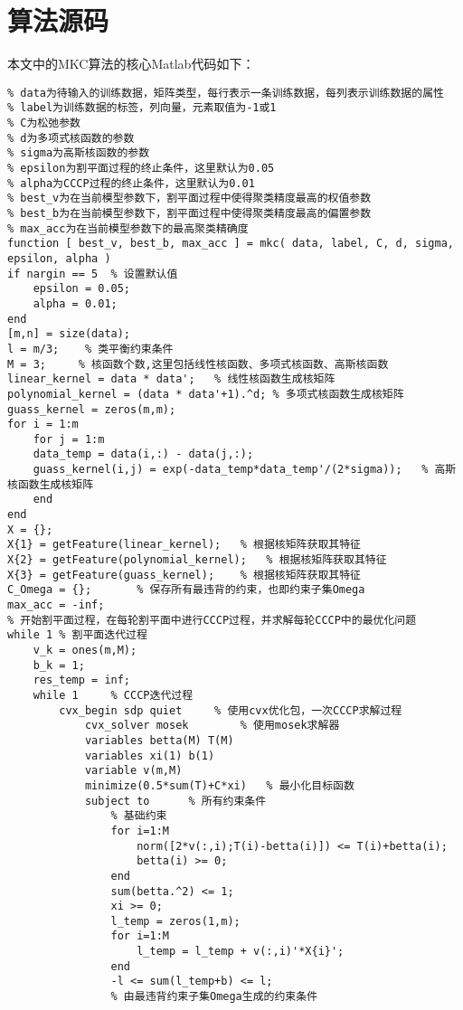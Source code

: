 \chapter*{算法源码}
\noindent 本文中的MKC算法的核心Matlab代码如下：
\begin{lstlisting}[basicstyle=\small\menlo]
% 参数介绍
% data为待输入的训练数据，矩阵类型，每行表示一条训练数据，每列表示训练数据的属性
% label为训练数据的标签，列向量，元素取值为-1或1
% C为松弛参数
% d为多项式核函数的参数
% sigma为高斯核函数的参数
% epsilon为割平面过程的终止条件，这里默认为0.05
% alpha为CCCP过程的终止条件，这里默认为0.01
% best_v为在当前模型参数下，割平面过程中使得聚类精度最高的权值参数
% best_b为在当前模型参数下，割平面过程中使得聚类精度最高的偏置参数
% max_acc为在当前模型参数下的最高聚类精确度
function [ best_v, best_b, max_acc ] = mkc( data, label, C, d, sigma, epsilon, alpha )
if nargin == 5	% 设置默认值
    epsilon = 0.05;
    alpha = 0.01;
end
[m,n] = size(data);
l = m/3;  	% 类平衡约束条件
M = 3;     % 核函数个数,这里包括线性核函数、多项式核函数、高斯核函数
linear_kernel = data * data';  	% 线性核函数生成核矩阵
polynomial_kernel = (data * data'+1).^d; % 多项式核函数生成核矩阵
guass_kernel = zeros(m,m);
for i = 1:m
    for j = 1:m
	data_temp = data(i,:) - data(j,:);
	guass_kernel(i,j) = exp(-data_temp*data_temp'/(2*sigma)); 	% 高斯核函数生成核矩阵
    end
end
X = {};
X{1} = getFeature(linear_kernel);	% 根据核矩阵获取其特征
X{2} = getFeature(polynomial_kernel);	% 根据核矩阵获取其特征
X{3} = getFeature(guass_kernel);	% 根据核矩阵获取其特征
C_Omega = {};		% 保存所有最违背的约束，也即约束子集Omega
max_acc = -inf;
% 开始割平面过程，在每轮割平面中进行CCCP过程，并求解每轮CCCP中的最优化问题
while 1	% 割平面迭代过程
    v_k = ones(m,M);
    b_k = 1;
    res_temp = inf;
    while 1		% CCCP迭代过程
        cvx_begin sdp quiet		% 使用cvx优化包，一次CCCP求解过程
            cvx_solver mosek		% 使用mosek求解器
            variables betta(M) T(M) 
            variables xi(1) b(1) 
            variable v(m,M)
            minimize(0.5*sum(T)+C*xi)	% 最小化目标函数
            subject to 		% 所有约束条件
                % 基础约束
                for i=1:M
                    norm([2*v(:,i);T(i)-betta(i)]) <= T(i)+betta(i);
                    betta(i) >= 0;
                end
                sum(betta.^2) <= 1;
                xi >= 0;
                l_temp = zeros(1,m);
                for i=1:M
                    l_temp = l_temp + v(:,i)'*X{i}';
                end
                -l <= sum(l_temp+b) <= l; 
                % 由最违背约束子集Omega生成的约束条件

\end{lstlisting}
